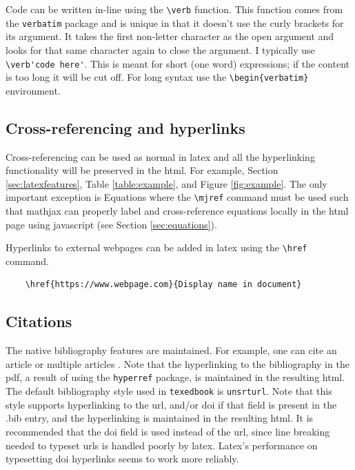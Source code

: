\documentclass{article}
\begin{document}
Code can be written in-line using the \verb'\verb' function. This function comes from the \verb'verbatim' package and is unique in that it doesn't use the curly brackets for its argument. It takes the first non-letter character as the open argument and looks for that same character again to close the argument. I typically use \verb_\verb'code here'_. This is meant for short (one word) expressions; if the content is too long it will be cut off. For long syntax use the \verb'\begin{verbatim}' environment.    

\subsection{Cross-referencing and hyperlinks}
Cross-referencing can be used as normal in latex and all the hyperlinking functionality will be preserved in the html. For example, Section \ref{sec:latexfeatures}, Table \ref{table:example}, and Figure \ref{fig:example}. The only important exception is Equations where the \verb'\mjref' command must be used such that mathjax can properly label and cross-reference equations locally in the html page using javascript (see Section \ref{sec:equations}).

Hyperlinks to external webpages can be added in latex using the \verb'\href' command.
\begin{verbatim}
    \href{https://www.webpage.com}{Display name in document}
\end{verbatim}

\subsection{Citations}
The native bibliography features are maintained. For example, one can cite an article \cite{Hanus2021} or multiple articles \cite{Hanus2019,Hanus2021,Gregory2021}. Note that the hyperlinking to the bibliography in the pdf, a result of using the \verb'hyperref' package, is maintained in the resulting html. The default bibliography style used in \verb'texedbook' is \verb'unsrturl'. Note that this style supports hyperlinking to the url, and/or doi if that field is present in the .bib entry, and the hyperlinking is maintained in the resulting html. It is recommended that the doi field is used instead of the url, since line breaking needed to typeset urls is handled poorly by latex. Latex's performance on typesetting doi hyperlinks seems to work more reliably.
\end{document}
